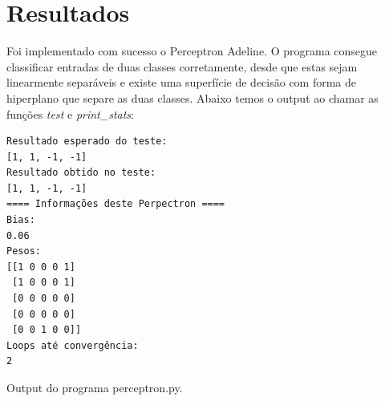 \documentclass[10pt,a4paper]{article}
\begin{document}
\section{Resultados}
Foi implementado com sucesso o Perceptron Adeline. O programa consegue classificar entradas  de duas classes corretamente,  desde  que estas sejam linearmente separáveis e existe uma superfície de decisão com forma de hiperplano que separe as duas classes. Abaixo temos o output ao chamar as funções \emph{test} e \emph{print\_stats}:
\begin{listing}
\begin{verbatim}
Resultado esperado do teste:
[1, 1, -1, -1]
Resultado obtido no teste:
[1, 1, -1, -1]
==== Informações deste Perpectron ==== 
Bias:
0.06
Pesos:
[[1 0 0 0 1]
 [1 0 0 0 1]
 [0 0 0 0 0]
 [0 0 0 0 0]
 [0 0 1 0 0]]
Loops até convergência:
2
\end{verbatim}
\label{lst:perceptron}
\caption{Output do programa perceptron.py.}
\end{listing}
\end{document}
